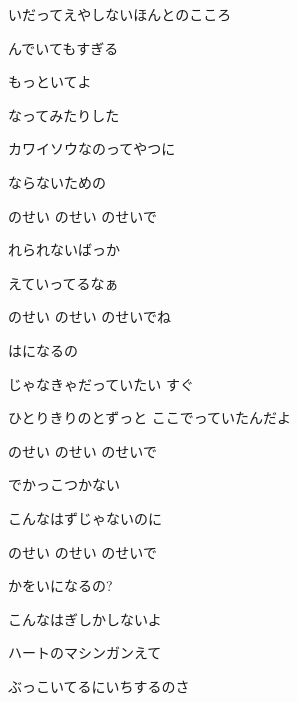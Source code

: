 \documentclass[14pt]{ltjsarticle}
\begin{document}
{  いだってえやしないほんとのこころ
  \jisho{}

  んでいてもすぎる

  もっといてよ
  \jisho{}

\item
  なってみたりした
  \jisho{}

  カワイソウなのってやつに
  \jisho{}

  ならないための
  \jisho{}

\item
  のせい のせい のせいで
  \jisho{}

  れられないばっか
  \jisho{}

  えていってるなぁ
  \jisho{}

  のせい のせい のせいでね
  \jisho{}

  はになるの
  \jisho{}

\item
  じゃなきゃだっていたい すぐ
  \jisho{}

  ひとりきりのとずっと ここでっていたんだよ
  \jisho{}

\item
  のせい のせい のせいで
  \jisho{}

  でかっこつかない
  \jisho{}

  こんなはずじゃないのに
  \jisho{}

  のせい のせい のせいで
  \jisho{}

  かをいになるの?
  \jisho{}

  こんなはぎしかしないよ
  \jisho{}

  ハートのマシンガンえて
  \jisho{}

  ぶっこいてるにいちするのさ
  \jisho{}

}
\end{document}
